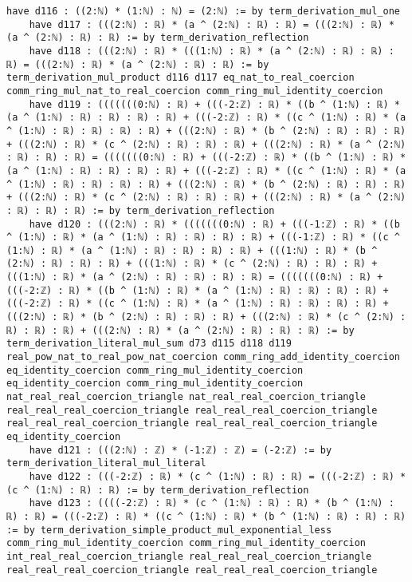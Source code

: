 \documentclass{article}
\begin{document}
\begin{tcolorbox}[colback=white!10, width=\linewidth]
\begin{lstlisting}[language=Lean4]
    have d116 : ((2:ℕ) * (1:ℕ) : ℕ) = (2:ℕ) := by term_derivation_mul_one
    have d117 : (((2:ℕ) : ℝ) * (a ^ (2:ℕ) : ℝ) : ℝ) = (((2:ℕ) : ℝ) * (a ^ (2:ℕ) : ℝ) : ℝ) := by term_derivation_reflection
    have d118 : (((2:ℕ) : ℝ) * (((1:ℕ) : ℝ) * (a ^ (2:ℕ) : ℝ) : ℝ) : ℝ) = (((2:ℕ) : ℝ) * (a ^ (2:ℕ) : ℝ) : ℝ) := by term_derivation_mul_product d116 d117 eq_nat_to_real_coercion comm_ring_mul_nat_to_real_coercion comm_ring_mul_identity_coercion
    have d119 : (((((((0:ℕ) : ℝ) + (((-2:ℤ) : ℝ) * ((b ^ (1:ℕ) : ℝ) * (a ^ (1:ℕ) : ℝ) : ℝ) : ℝ) : ℝ) + (((-2:ℤ) : ℝ) * ((c ^ (1:ℕ) : ℝ) * (a ^ (1:ℕ) : ℝ) : ℝ) : ℝ) : ℝ) + (((2:ℕ) : ℝ) * (b ^ (2:ℕ) : ℝ) : ℝ) : ℝ) + (((2:ℕ) : ℝ) * (c ^ (2:ℕ) : ℝ) : ℝ) : ℝ) + (((2:ℕ) : ℝ) * (a ^ (2:ℕ) : ℝ) : ℝ) : ℝ) = (((((((0:ℕ) : ℝ) + (((-2:ℤ) : ℝ) * ((b ^ (1:ℕ) : ℝ) * (a ^ (1:ℕ) : ℝ) : ℝ) : ℝ) : ℝ) + (((-2:ℤ) : ℝ) * ((c ^ (1:ℕ) : ℝ) * (a ^ (1:ℕ) : ℝ) : ℝ) : ℝ) : ℝ) + (((2:ℕ) : ℝ) * (b ^ (2:ℕ) : ℝ) : ℝ) : ℝ) + (((2:ℕ) : ℝ) * (c ^ (2:ℕ) : ℝ) : ℝ) : ℝ) + (((2:ℕ) : ℝ) * (a ^ (2:ℕ) : ℝ) : ℝ) : ℝ) := by term_derivation_reflection
    have d120 : (((2:ℕ) : ℝ) * (((((((0:ℕ) : ℝ) + (((-1:ℤ) : ℝ) * ((b ^ (1:ℕ) : ℝ) * (a ^ (1:ℕ) : ℝ) : ℝ) : ℝ) : ℝ) + (((-1:ℤ) : ℝ) * ((c ^ (1:ℕ) : ℝ) * (a ^ (1:ℕ) : ℝ) : ℝ) : ℝ) : ℝ) + (((1:ℕ) : ℝ) * (b ^ (2:ℕ) : ℝ) : ℝ) : ℝ) + (((1:ℕ) : ℝ) * (c ^ (2:ℕ) : ℝ) : ℝ) : ℝ) + (((1:ℕ) : ℝ) * (a ^ (2:ℕ) : ℝ) : ℝ) : ℝ) : ℝ) = (((((((0:ℕ) : ℝ) + (((-2:ℤ) : ℝ) * ((b ^ (1:ℕ) : ℝ) * (a ^ (1:ℕ) : ℝ) : ℝ) : ℝ) : ℝ) + (((-2:ℤ) : ℝ) * ((c ^ (1:ℕ) : ℝ) * (a ^ (1:ℕ) : ℝ) : ℝ) : ℝ) : ℝ) + (((2:ℕ) : ℝ) * (b ^ (2:ℕ) : ℝ) : ℝ) : ℝ) + (((2:ℕ) : ℝ) * (c ^ (2:ℕ) : ℝ) : ℝ) : ℝ) + (((2:ℕ) : ℝ) * (a ^ (2:ℕ) : ℝ) : ℝ) : ℝ) := by term_derivation_literal_mul_sum d73 d115 d118 d119 real_pow_nat_to_real_pow_nat_coercion comm_ring_add_identity_coercion eq_identity_coercion comm_ring_mul_identity_coercion eq_identity_coercion comm_ring_mul_identity_coercion nat_real_real_coercion_triangle nat_real_real_coercion_triangle real_real_real_coercion_triangle real_real_real_coercion_triangle real_real_real_coercion_triangle real_real_real_coercion_triangle eq_identity_coercion
    have d121 : (((2:ℕ) : ℤ) * (-1:ℤ) : ℤ) = (-2:ℤ) := by term_derivation_literal_mul_literal
    have d122 : (((-2:ℤ) : ℝ) * (c ^ (1:ℕ) : ℝ) : ℝ) = (((-2:ℤ) : ℝ) * (c ^ (1:ℕ) : ℝ) : ℝ) := by term_derivation_reflection
    have d123 : ((((-2:ℤ) : ℝ) * (c ^ (1:ℕ) : ℝ) : ℝ) * (b ^ (1:ℕ) : ℝ) : ℝ) = (((-2:ℤ) : ℝ) * ((c ^ (1:ℕ) : ℝ) * (b ^ (1:ℕ) : ℝ) : ℝ) : ℝ) := by term_derivation_simple_product_mul_exponential_less comm_ring_mul_identity_coercion comm_ring_mul_identity_coercion int_real_real_coercion_triangle real_real_real_coercion_triangle real_real_real_coercion_triangle real_real_real_coercion_triangle

\end{lstlisting}
\end{tcolorbox}
\end{document}

